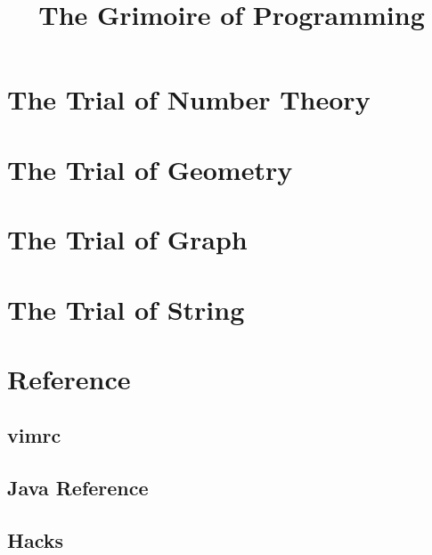 \documentclass[a4paper]{report}
\title{The Grimoire of Programming}
\date{}
\author{}
\begin{document}
	\maketitle
	\chapter{The Trial of Number Theory}
		
	\chapter{The Trial of Geometry}
		
	\chapter{The Trial of Graph}
		
	\chapter{The Trial of String}
		
	\chapter{Reference}
		\section{vimrc}
			
		\section{Java Reference}
			
		\section{Hacks}
			
\end{document}

